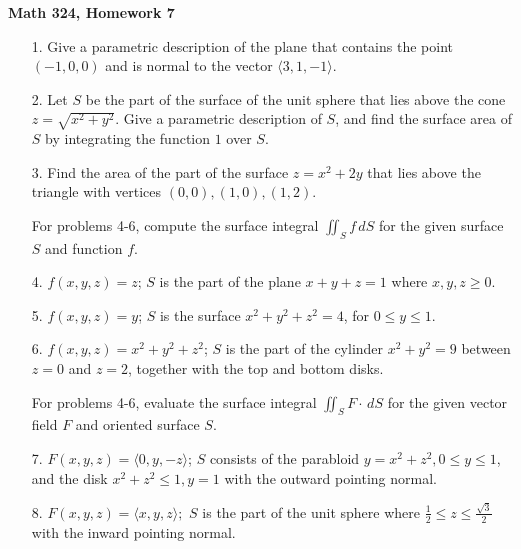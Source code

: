 \documentclass[11 pt]{report}
\begin{document}
\centerline{\bf Math 324, Homework 7}


\vspace{.2cm}

\begin{enumerate} \item[1.] Give a parametric description of the plane that contains the point $(-1, 0, 0)$ and is normal to the vector $\langle 3, 1, -1 \rangle$. 

\item[2.] Let $S$ be the part of the surface of the  unit sphere that lies above the cone $z = \sqrt{x^2+y^2}$. Give a parametric description of $S$, and find the surface area of $S$ by integrating the function $1$ over $S$. 

\item[3.] Find the area of the part of the surface $z = x^2 + 2y$ that lies above the triangle with vertices $(0,0), (1,0), (1,2)$. 

\item[] For problems 4-6, compute the surface integral $\iint_S f \, dS$ for the given surface $S$ and function $f$. 

\item[4.] $f(x,y,z) = z$; $S$ is the part of the plane $x+y+z = 1$ where $x,y,z \geq 0$. 

\item[5.] $f(x,y,z) = y$; $S$ is the surface $x^2+y^2+z^2 = 4$, for $0 \leq y \leq 1$. 

\item[6.] $f(x,y,z) = x^2+y^2+z^2$; $S$ is the part of the cylinder $x^2+y^2 = 9$ between $z=0$ and $z=2$, together with the top and bottom disks. 

For problems 4-6, evaluate the surface integral $\iint_S F \cdot \, dS$ for the given vector field $F$ and oriented surface $S$. 

\item[7.] $F(x,y,z) = \langle 0, y, -z \rangle$; $S$ consists of the parabloid $y = x^2+z^2, 0 \leq y \leq 1$, and the disk $x^2+z^2 \leq 1, y = 1$ with the outward pointing normal. 

\item[8.] $F(x,y,z) = \langle x,y,z \rangle;$ $S$ is the part of the unit sphere where $\frac{1}{2} \leq z \leq \frac{\sqrt{3}}{2}$ with the inward pointing normal. 


\end{enumerate}
\end{document}
